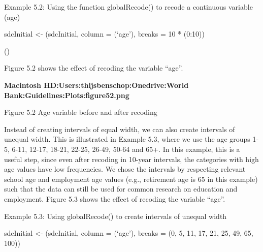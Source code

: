 \documentclass[letterpaper,10pt,english]{sphinxmanual}
\begin{document}
Example 5.2: Using the  function globalRecode() to recode a
continuous variable (age)

sdcInitial \textless{}- (sdcInitial, column = (‘age’),
breaks = 10 * (0:10))


\begin{DUlineblock}{0em}
\item[] ()
\item[] \sphinxcode{\sphinxupquote{\#\#   (0,10{]}  (10,20{]}  (20,30{]}  (30,40{]}  (40,50{]}  (50,60{]}  (60,70{]}  (70,80{]}  (80,90{]}  (90,100{]}}}
\item[] 
\end{DUlineblock}

Figure 5.2 shows the effect of recoding the variable “age”.

{\color{red}\bfseries{}\textbar{}Macintosh HD:Users:thijsbenschop:Onedrive:World
Bank:Guidelines:Plots:figure52.png\textbar{}}

Figure 5.2 Age variable before and after recoding

Instead of creating intervals of equal width, we can also create
intervals of unequal width. This is illustrated in Example 5.3, where we
use the age groups 1-5, 6-11, 12-17, 18-21, 22-25, 26-49, 50-64 and 65+.
In this example, this is a useful step, since even after recoding in
10-year intervals, the categories with high age values have low
frequencies. We chose the intervals by respecting relevant school age
and employment age values (e.g., retirement age is 65 in this example)
such that the data can still be used for common research on education
and employment. Figure 5.3 shows the effect of recoding the variable
“age”.

Example 5.3: Using globalRecode() to create intervals of unequal width

sdcInitial \textless{}- (sdcInitial, column = (‘age’),
breaks = (0, 5, 11, 17, 21, 25, 49, 65, 100))

\end{document}
